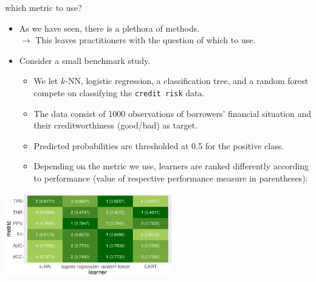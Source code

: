 \documentclass[11pt,compress,t,notes=noshow, xcolor=table]{beamer}
\begin{document}

\begin{vbframe}{which metric to use?}

\begin{itemize}
  \footnotesize
  \item As we have seen, there is a plethora of methods. \\
  $\rightarrow$ This leaves practitioners with the question of which to use.
  \item Consider a small benchmark study.
  \begin{itemize}
    \footnotesize
    \item We let $k$-NN, logistic regression, a classification tree, and a random
    forest compete on classifying the \texttt{credit risk} data.
    \item The data consist of 1000 observations of borrowers' financial
    situation and their creditworthiness (good/bad) as target.
    \item Predicted probabilities are thresholded at 0.5 for the positive class.
    \item Depending on the metric we use, learners are ranked differently
    according to performance (value of respective performance measure in
    parentheses):
  \end{itemize}
\end{itemize}

\begin{center}
\includegraphics[width=0.55\textwidth]{figure/eval_mclass_benchmark.pdf}
\end{center}

\framebreak


\end{vbframe}
\end{document}
